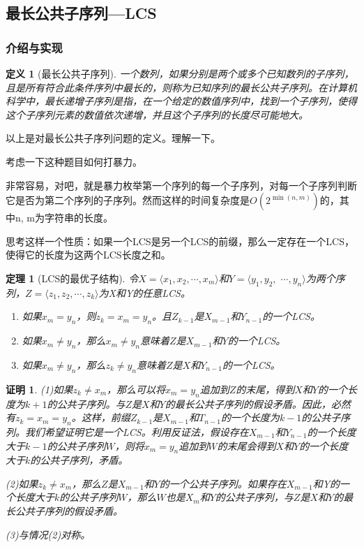 \documentclass{article}
\newtheorem{definition}{定义}[subsection]
\newtheorem{thm}{定理}[subsection]
\theoremstyle{nonumberplain}
\newtheorem{Proof}{证明}
\begin{document}
\subsection{最长公共子序列---LCS}
\subsubsection{介绍与实现}
\begin{definition}[最长公共子序列]
一个数列，如果分别是两个或多个已知数列的子序列，且是所有符合此条件序列中最长的，则称为已知序列的最长公共子序列。在计算机科学中，最长递增子序列是指，在一个给定的数值序列中，找到一个子序列，使得这个子序列元素的数值依次递增，并且这个子序列的长度尽可能地大。
\end{definition}

以上是对最长公共子序列问题的定义。理解一下。

考虑一下这种题目如何打暴力。

非常容易，对吧，就是暴力枚举第一个序列的每一个子序列，对每一个子序列判断它是否为第二个序列的子序列。然而这样的时间复杂度是$O(2^{\min(n,m)})$的，其中n, m为字符串的长度。

思考这样一个性质：如果一个LCS是另一个LCS的前缀，那么一定存在一个LCS，使得它的长度为这两个LCS长度之和。

\begin{thm}[LCS的最优子结构]
	令$X=\langle x_1, x_2, \cdots, x_m\rangle$和$Y=\langle y_1, y_2,$ $\cdots,y_n\rangle$为两个序列，$Z=\langle z_1, z_2, \cdots, z_k\rangle$为X和Y的任意LCS。
	\begin{enumerate}
		\item{如果$x_m=y_n$，则$z_k=x_m=y_n$。且$Z_{k-1}$是$X_{m-1}$和$Y_{n-1}$的一个LCS。}
		\item{如果$x_m\neq y_n$，那么$x_m\neq y_n$意味着$Z$是$X_{m-1}$和$Y$的一个LCS。}
		\item{如果$x_m\neq y_n$，那么$z_k\neq y_n$意味着$Z$是$X$和$Y_{n-1}$的一个LCS。}
	\end{enumerate}
\end{thm}
\begin{Proof}
	(1)如果$z_k\neq x_m$，那么可以将$x_m=y_n$追加到$Z$的末尾，得到$X$和$Y$的一个长度为$k+1$的公共子序列。与$Z$是$X$和$Y$的最长公共子序列的假设矛盾。因此，必然有$z_k=x_m=y_n$。这样，前缀$Z_{k-1}$是$X_{m-1}$和$T_{n-1}$的一个长度为$k-1$的公共子序列。我们希望证明它是一个LCS。利用反证法，假设存在$X_{m-1}$和$Y_{n-1}$的一个长度大于$k-1$的公共子序列$W$，则将$x_m=y_n$追加到$W$的末尾会得到$X$和$Y$的一个长度大于$k$的公共子序列，矛盾。

	(2)如果$z_k\neq x_m$，那么$Z$是$X_{m-1}$和$Y$的一个公共子序列。如果存在$X_{m-1}$和Y的一个长度大于$k$的公共子序列$W$，那么$W$也是$X_m$和$Y$的公共子序列，与$Z$是$X$和$Y$的最长公共子序列的假设矛盾。

	(3)与情况(2)对称。\
\end{Proof}
\end{document}
